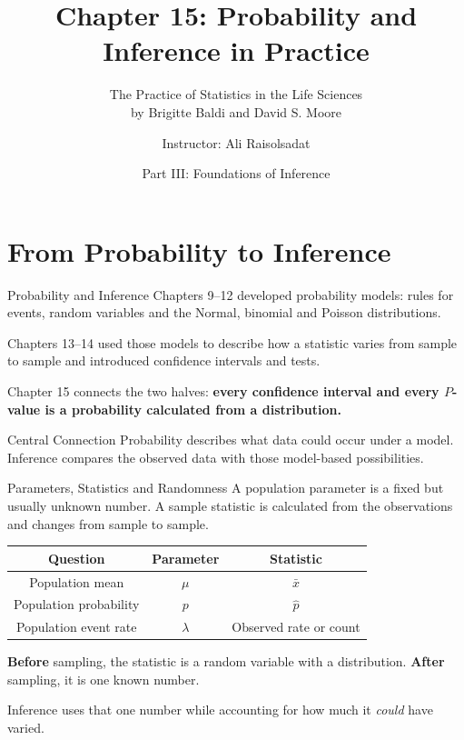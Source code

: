 \documentclass[aspectratio=169]{beamer}
\title[Chapter 15: Inference in Practice]{\textbf{Chapter 15: Probability and Inference in Practice}}
\subtitle{The Practice of Statistics in the Life Sciences \\ by Brigitte Baldi and David S. Moore}
\author{Instructor: Ali Raisolsadat}
\date{Part III: Foundations of Inference}
\begin{document}
\begin{frame}
  \titlepage
\end{frame}

\section{From Probability to Inference}

\begin{frame}{Probability and Inference}
Chapters 9--12 developed probability models: rules for events, random variables and the Normal, binomial and Poisson distributions.

\vspace{0.2cm}
Chapters 13--14 used those models to describe how a statistic varies from sample to sample and introduced confidence intervals and tests.

\vspace{0.2cm}
Chapter 15 connects the two halves: \textbf{every confidence interval and every $P$-value is a probability calculated from a distribution.}

\begin{block}{Central Connection}
Probability describes what data could occur under a model. Inference compares the observed data with those model-based possibilities.
\end{block}
\end{frame}

\begin{frame}{Parameters, Statistics and Randomness}
A population parameter is a fixed but usually unknown number. A sample statistic is calculated from the observations and changes from sample to sample.

\begin{center}
\begin{tabular}{ccc}
\toprule
\textbf{Question} & \textbf{Parameter} & \textbf{Statistic} \\
\midrule
Population mean & $\mu$ & $\bar{x}$ \\
Population probability & $p$ & $\hat p$ \\
Population event rate & $\lambda$ & Observed rate or count \\
\bottomrule
\end{tabular}
\end{center}

\vspace{0.2cm}
\textbf{Before} sampling, the statistic is a random variable with a distribution. \textbf{After} sampling, it is one known number.

\vspace{0.1cm}
Inference uses that one number while accounting for how much it \emph{could} have varied.
\end{frame}
\end{document}
